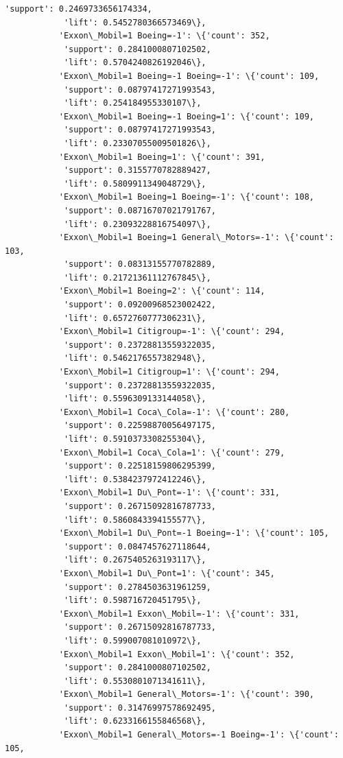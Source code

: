 \documentclass[11pt]{article}
\begin{document}
\begin{Verbatim}[commandchars=\\\{\}]
            'support': 0.2469733656174334,
            'lift': 0.5452780366573469\},
           'Exxon\_Mobil=1 Boeing=-1': \{'count': 352,
            'support': 0.2841000807102502,
            'lift': 0.5704240826192046\},
           'Exxon\_Mobil=1 Boeing=-1 Boeing=-1': \{'count': 109,
            'support': 0.08797417271993543,
            'lift': 0.254184955330107\},
           'Exxon\_Mobil=1 Boeing=-1 Boeing=1': \{'count': 109,
            'support': 0.08797417271993543,
            'lift': 0.23307055009501826\},
           'Exxon\_Mobil=1 Boeing=1': \{'count': 391,
            'support': 0.3155770782889427,
            'lift': 0.5809911349048729\},
           'Exxon\_Mobil=1 Boeing=1 Boeing=-1': \{'count': 108,
            'support': 0.08716707021791767,
            'lift': 0.23093228816754097\},
           'Exxon\_Mobil=1 Boeing=1 General\_Motors=-1': \{'count': 103,
            'support': 0.08313155770782889,
            'lift': 0.21721361112767845\},
           'Exxon\_Mobil=1 Boeing=2': \{'count': 114,
            'support': 0.09200968523002422,
            'lift': 0.6572760777306231\},
           'Exxon\_Mobil=1 Citigroup=-1': \{'count': 294,
            'support': 0.23728813559322035,
            'lift': 0.5462176557382948\},
           'Exxon\_Mobil=1 Citigroup=1': \{'count': 294,
            'support': 0.23728813559322035,
            'lift': 0.5596309133144058\},
           'Exxon\_Mobil=1 Coca\_Cola=-1': \{'count': 280,
            'support': 0.22598870056497175,
            'lift': 0.5910373308255304\},
           'Exxon\_Mobil=1 Coca\_Cola=1': \{'count': 279,
            'support': 0.22518159806295399,
            'lift': 0.5384237972412246\},
           'Exxon\_Mobil=1 Du\_Pont=-1': \{'count': 331,
            'support': 0.26715092816787733,
            'lift': 0.5860843394155577\},
           'Exxon\_Mobil=1 Du\_Pont=-1 Boeing=-1': \{'count': 105,
            'support': 0.0847457627118644,
            'lift': 0.2675405263193117\},
           'Exxon\_Mobil=1 Du\_Pont=1': \{'count': 345,
            'support': 0.2784503631961259,
            'lift': 0.598716720451795\},
           'Exxon\_Mobil=1 Exxon\_Mobil=-1': \{'count': 331,
            'support': 0.26715092816787733,
            'lift': 0.599007081010972\},
           'Exxon\_Mobil=1 Exxon\_Mobil=1': \{'count': 352,
            'support': 0.2841000807102502,
            'lift': 0.5530801071341611\},
           'Exxon\_Mobil=1 General\_Motors=-1': \{'count': 390,
            'support': 0.31476997578692495,
            'lift': 0.6233166155846568\},
           'Exxon\_Mobil=1 General\_Motors=-1 Boeing=-1': \{'count': 105,

\end{Verbatim}
\end{document}
